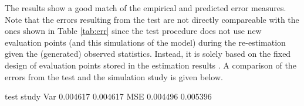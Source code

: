 \documentclass[article, nojss]{jss}
\numberwithin{equation}{section}			%
\begin{document}
The results show a good match of the empirical and predicted error
measures. Note that the errors resulting from the test are not directly
compareable with the ones shown in Table \ref{tab:err} since the test
procedure does not use new evaluation points (and this simulations of the
model) during the re-estimation given the (generated) observed statistics.
Instead, it is solely based on the fixed design of evaluation points stored in
the estimation results . A comparison of the errors from the test and
the simulation study is given below.
\begin{Schunk}
\begin{Soutput}
        test    study
Var 0.004617 0.004617
MSE 0.004496 0.005396
\end{Soutput}
\end{Schunk}
%
\end{document}
